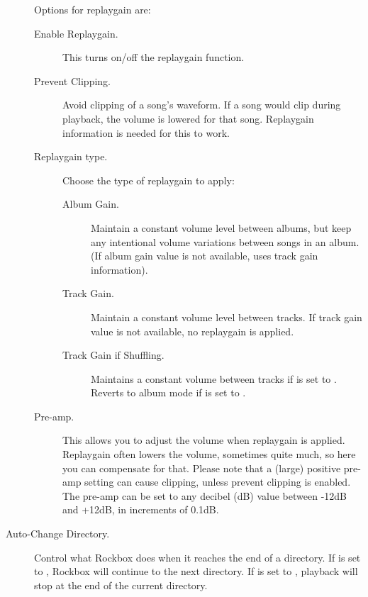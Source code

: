 \begin{description}
{      Options for replaygain are:
      \begin{description}
      \item[Enable Replaygain. ]This turns on/off the replaygain function.
      \item[Prevent Clipping. ]Avoid clipping of a song's waveform.
        If a song would clip during playback, the volume is lowered for 
        that song. Replaygain information is needed for this to work.
      \item[Replaygain type. ]Choose the type of replaygain to apply:
        \begin{description}
        \item[Album Gain. ]Maintain a constant volume level between
          albums, but keep any intentional volume variations between 
          songs in an album. (If album gain value is not available,
          uses track gain information).
        \item[Track Gain. ]Maintain a constant volume level between
          tracks. If track gain value is not available, no replaygain 
          is applied.
        \item[Track Gain if Shuffling. ]Maintains a constant volume
          between tracks if  is set to .
          Reverts to album mode if  is set to .
        \end{description}
      \item[Pre-amp. ]This allows you to adjust the volume when replaygain
        is applied. Replaygain often lowers the volume, sometimes quite
        much, so here you can compensate for that. Please note that a
        (large) positive pre-amp setting can cause clipping, unless
        prevent clipping is enabled.  The pre-amp can be set to any
        decibel (dB) value between -12dB and +12dB, in increments of 0.1{}dB.
      \end{description}
    }

\item[Auto-Change Directory. ]Control what Rockbox does when it reaches the end
  of a directory. If  is set to ,
  Rockbox will continue to the next directory. If
   is set to , playback will stop at
  the end of the current directory.


\end{description}
